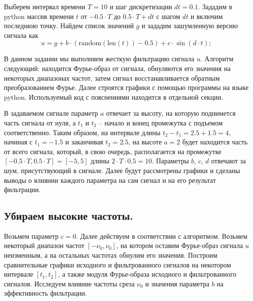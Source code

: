 \documentclass[a4paper, 12pt]{article}
\begin{document}
    Выберем интервал времени $T=10$ и шаг дискретизации $dt=0.1$. Зададим в python массив времени $t$ от $-0.5\cdot T$ до $0.5\cdot T+dt$
    с шагом $dt$ и включим последнюю точку. Найдем список значений $g$ и зададим зашумленную версию сигнала как
    $$
    u=g+b\cdot(\text{random}(\text{len}(t))-0.5) + c\cdot \sin(d\cdot t);
    $$


    В данном задании мы выполняем жесткую фильтрацию сигнала $u$. Алгоритм следующий: находится Фурье-образ от сигнала,
    обнуляются его значения на некоторых диапазонах частот, затем сигнал восстанавливается обратным преобразованием Фурье.
    Далее строятся графики с помощью программы на языке python. Используемый код с пояснениями находится в отдельной секции.


    В задаваемом сигнале параметр $a$ отвечает за высоту, на которую поднимется часть сигнала от нуля, а $t_1 \text{ и } t_2$ -- начало
    и конец промежутка с подъемом соответственно. Таким образом, на интервале длины $t_2-t_1=2.5+1.5=4$, начиная с $t_1=-1.5$ и заканчивая $t_2=2.5$,
    на высоте $a=2$ будет находится часть от всего сигнала, который, в свою очередь, располагается на промежутке $[-0.5\cdot T,0.5\cdot T]=[-5,5]$
    длины $2\cdot T\cdot 0.5=10$. Параметры $b,\,c,\,d$ отвечают за шум, присутствующий в сигнале. Далее будут рассмотрены графики и сделаны выводы о
    влиянии каждого параметра на сам сигнал и на его результат фильтрации.


    \subsection{Убираем высокие частоты.}
    Возьмем параметр $c=0$. Далее действуем в соответствии с алгоритмом. Возьмем некоторый диапазон частот $[-\nu_0, \nu_0]$, на котором оставим Фурье-образ
    сигнала $u$ неизменным, а на остальных частотах обнулим его значения. Построим сравнительные графики исходного и фильтрованного сигналов на некотором
    интервале $[t_1,t_2]$, а также модуля Фурье-образа исходного и фильтрованного сигналов. Исследуем влияние частоты среза $\nu_0$ и значения параметра $b$
    на эффективность фильтрации.
    
\end{document}
